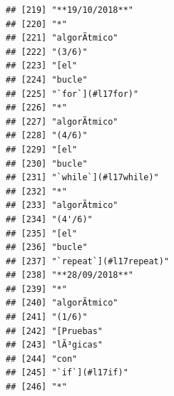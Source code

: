 \documentclass[
]{book}
\begin{document}
\begin{verbatim}
## [219] "**19/10/2018**"                                                                   
## [220] "*"                                                                                
## [221] "algorÃ­tmico"                                                                     
## [222] "(3/6)"                                                                            
## [223] "[el"                                                                              
## [224] "bucle"                                                                            
## [225] "`for`](#l17for)"                                                                  
## [226] "*"                                                                                
## [227] "algorÃ­tmico"                                                                     
## [228] "(4/6)"                                                                            
## [229] "[el"                                                                              
## [230] "bucle"                                                                            
## [231] "`while`](#l17while)"                                                              
## [232] "*"                                                                                
## [233] "algorÃ­tmico"                                                                     
## [234] "(4'/6)"                                                                           
## [235] "[el"                                                                              
## [236] "bucle"                                                                            
## [237] "`repeat`](#l17repeat)"                                                            
## [238] "**28/09/2018**"                                                                   
## [239] "*"                                                                                
## [240] "algorÃ­tmico"                                                                     
## [241] "(1/6)"                                                                            
## [242] "[Pruebas"                                                                         
## [243] "lÃ³gicas"                                                                         
## [244] "con"                                                                              
## [245] "`if`](#l17if)"                                                                    
## [246] "*"                                                                                

\end{verbatim}
\end{document}
